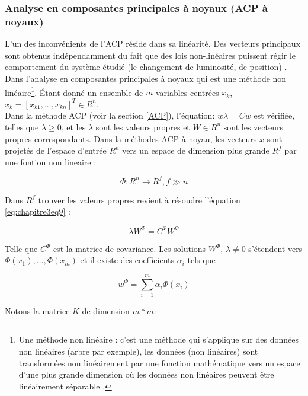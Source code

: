 \subsubsection{Analyse en composantes principales à noyaux (ACP à noyaux)}
L'un des inconvénients de l'ACP réside dans sa linéarité. Des vecteurs principaux sont obtenus indépendamment du fait que des lois non-linéaires puissent régir le comportement du système étudié (le changement de luminosité, de position) \citep{honeine2007methodes}. Dans l'analyse en composantes principales à noyaux qui est une méthode non linéaire\footnote{Une méthode non linéaire : c'est une méthode qui s'applique sur des données non linéaires (arbre par exemple), les données (non linéaires) sont transformées non linéairement par une fonction mathématique vers un espace d’une plus grande dimension où les données non linéaires peuvent être linéairement séparable \citep{diederich2001face}.}.
Étant donné un ensemble de $ m $ variables centrées $x_{k}$, $x_{k}=[x_{k1},...,x_{kn}]^{T}\in R^{n}$.
\\
Dans la méthode ACP (voir la section \ref{ACP}), l’équation: $w\lambda =Cw$ est vérifiée, telles que $\lambda \geq 0$, et les $\lambda$ sont les valeurs propres et $W\in R^{n}$ sont les vecteurs propres correspondants.
Dans la méthodes ACP à noyau, les vecteurs $ x $ sont projetés de l’espace d’entrée $R^{n}$ vers un espace de dimension plus grande $R^{f}$ par une fontion non lineaire :
\begin{center}
	\begin{equation}
	\label{eq:chapitre3eq8}
	\Phi :R^{n}\rightarrow R^{f}, f\gg n	
	\end{equation}
\end{center}
Dans $R^{f}$ trouver les valeurs propres revient à résoudre l’équation \ref{eq:chapitre3eq9} :
\begin{center}
	\begin{equation}
	\label{eq:chapitre3eq9}
	\lambda W^{\Phi }=C^{\Phi }W^{\Phi } 
	\end{equation}
\end{center}
Telle que $C^{\Phi }$ est la matrice de covariance. Les solutions $W^{\Phi }$, $\lambda \neq 0$ s’étendent vers $\Phi \left (x_{1} \right),...,\Phi \left (x_{m} \right)$ et il existe des coefficients $\alpha _{i}$ tels que 

\begin{center}
	\begin{equation}\label{eq:chapitre3eq10}
	w^{\Phi }=\sum_{i=1}^{m}\alpha_{i}\Phi \left (x_{i} \right)
	\end{equation}
\end{center}
Notons la matrice $K$ de dimension $m*m$:

